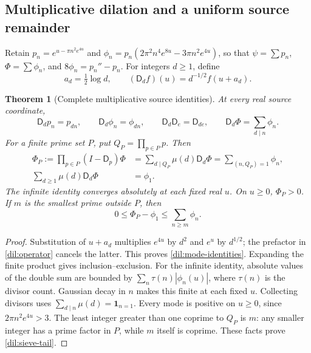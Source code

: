\documentclass[11pt]{article}
\numberwithin{equation}{section}
\newtheorem{theorem}{Theorem}[section]
\theoremstyle{definition}
\theoremstyle{remark}
\begin{document}
\subsection{Multiplicative dilation and a uniform source remainder}
\label{dil:source-arithmetic}

Retain $p_n=e^{u-\pi n^2e^{4u}}$ and
$\phi_n=p_n(2\pi^2n^4e^{8u}-3\pi n^2e^{4u})$, so that
$\psi=\sum p_n$, $\Phi=\sum\phi_n$, and $8\phi_n=p_n''-p_n$.
For integers $d\ge1$, define
\begin{equation}
 a_d=\tfrac12\log d,\qquad
 (\mathsf D_df)(u)=d^{-1/2}f(u+a_d).
 \label{dil:operator}
\end{equation}
\begin{theorem}[Complete multiplicative source identities]
\label{dil:sieve}
At every real source coordinate,
\begin{equation}
 \mathsf D_dp_n=p_{dn},\qquad
 \mathsf D_d\phi_n=\phi_{dn},\qquad
 \mathsf D_d\mathsf D_e=\mathsf D_{de},\qquad
 \mathsf D_d\Phi=\sum_{d\mid n}\phi_n.
 \label{dil:mode-identities}
\end{equation}
For a finite prime set $P$, put $Q_P=\prod_{p\in P}p$. Then
\begin{equation}
 \begin{aligned}
 \Phi_P:=\prod_{p\in P}(I-\mathsf D_p)\Phi
 &=\sum_{d\mid Q_P}\mu(d)\mathsf D_d\Phi
 =\sum_{(n,Q_P)=1}\phi_n,\\
 \sum_{d\ge1}\mu(d)\mathsf D_d\Phi&=\phi_1.
 \end{aligned}
 \label{dil:sieve-mobius}
\end{equation}
The infinite identity converges absolutely at each fixed real $u$.
On $u\ge0$, $\Phi_P>0$. If $m$ is the smallest prime outside $P$, then
\begin{equation}
 0\le\Phi_P-\phi_1\le\sum_{n\ge m}\phi_n.
 \label{dil:sieve-tail}
\end{equation}
\end{theorem}
\begin{proof}
Substitution of $u+a_d$ multiplies $e^{4u}$ by $d^2$ and $e^u$ by
$d^{1/2}$; the prefactor in \eqref{dil:operator} cancels the latter.
This proves \eqref{dil:mode-identities}. Expanding the finite product
gives inclusion--exclusion. For the infinite identity, absolute values
of the double sum are bounded by $\sum_n\tau(n)|\phi_n(u)|$, where
$\tau(n)$ is the divisor count. Gaussian decay in $n$ makes this finite
at each fixed $u$. Collecting divisors uses
$\sum_{d\mid n}\mu(d)=\mathbf1_{n=1}$.
Every mode is positive on $u\ge0$, since $2\pi n^2e^{4u}>3$.
The least integer greater than one coprime to $Q_P$ is $m$: any smaller
integer has a prime factor in $P$, while $m$ itself is coprime.
These facts prove \eqref{dil:sieve-tail}.
\end{proof}
\end{document}
